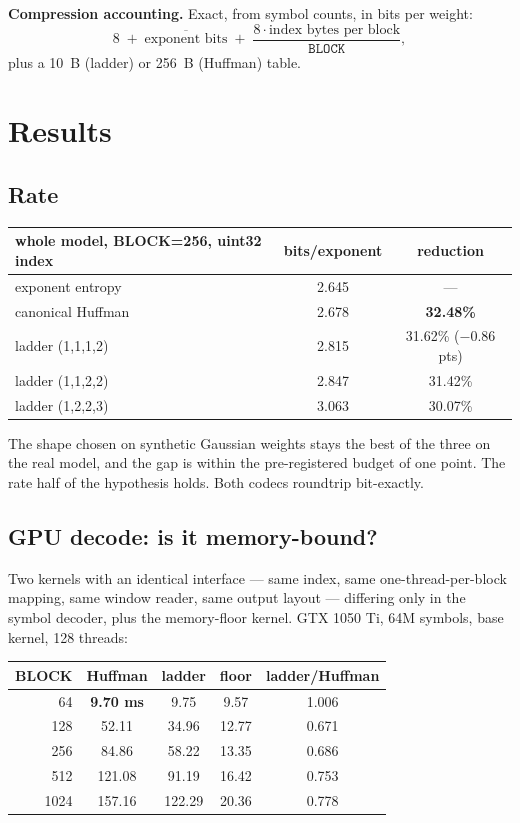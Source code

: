 \documentclass[11pt,a4paper]{article}
\newcommand{\code}[1]{\texttt{#1}}
\newcommand{\B}[1]{\textbf{#1}}
\begin{document}
\B{Compression accounting.} Exact, from symbol counts, in bits per weight:
\[
8 \;+\; \overline{\text{exponent bits}} \;+\; \frac{8 \cdot \text{index bytes per block}}{\code{BLOCK}},
\]
plus a 10~B (ladder) or 256~B (Huffman) table.

\section{Results}\label{sec:results}

\subsection{Rate}

\begin{center}
\begin{tabular}{@{}lcc@{}}
\toprule
whole model, BLOCK=256, uint32 index & bits/exponent & reduction \\
\midrule
exponent entropy & 2.645 & --- \\
canonical Huffman & 2.678 & \B{32.48\%} \\
ladder (1,1,1,2) & 2.815 & 31.62\% ($-0.86$ pts) \\
ladder (1,1,2,2) & 2.847 & 31.42\% \\
ladder (1,2,2,3) & 3.063 & 30.07\% \\
\bottomrule
\end{tabular}
\end{center}

The shape chosen on synthetic Gaussian weights stays the best of the three on the real model, and the gap is within the pre-registered budget of one point. The rate half of the hypothesis holds. Both codecs roundtrip bit-exactly.

\subsection{GPU decode: is it memory-bound?}\label{sec:gpu}

Two kernels with an identical interface --- same index, same one-thread-per-block mapping, same window reader, same output layout --- differing only in the symbol decoder, plus the memory-floor kernel. GTX 1050 Ti, 64M symbols, base kernel, 128 threads:

\begin{center}
\begin{tabular}{@{}rcccc@{}}
\toprule
BLOCK & Huffman & ladder & floor & ladder/Huffman \\
\midrule
64 & \B{9.70 ms} & 9.75 & 9.57 & 1.006 \\
128 & 52.11 & 34.96 & 12.77 & 0.671 \\
256 & 84.86 & 58.22 & 13.35 & 0.686 \\
512 & 121.08 & 91.19 & 16.42 & 0.753 \\
1024 & 157.16 & 122.29 & 20.36 & 0.778 \\
\bottomrule
\end{tabular}
\end{center}
\end{document}
